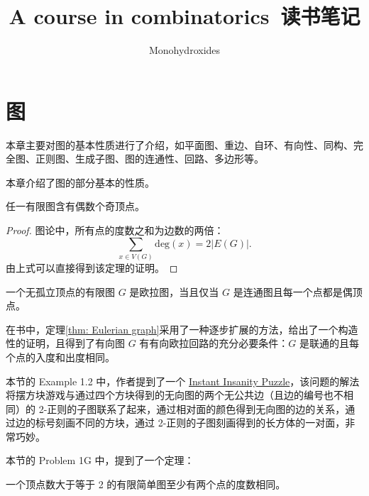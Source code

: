 \documentclass[cn,hazy,sakura,14pt,normal]{elegantnote}
\title{A course in combinatorics\ 读书笔记}
\author{Monohydroxides}
\date{\zhtoday}
\begin{document}
\begin{sloppypar}

\maketitle

\newpage

\tableofcontents

\newpage

\setcounter{page}{1}

\section{图} \label{sec: graph}

本章主要对图的基本性质进行了介绍，如平面图、重边、自环、有向性、同构、完全图、正则图、生成子图、图的连通性、回路、多边形等。

本章介绍了图的部分基本的性质。

\begin{theorem} \label{thm: First theorem of graph theory}
    任一有限图含有偶数个奇顶点。
\end{theorem}

\begin{proof}
    图论中，所有点的度数之和为边数的两倍：
    \begin{equation}
    \sum_{x \in V(G)} \text{deg}(x) = 2 \left| E(G) \right|.
    \end{equation}
    由上式可以直接得到该定理的证明。
\end{proof}

\begin{theorem} \label{thm: Eulerian graph}
    一个无孤立顶点的有限图 $G$ 是欧拉图，当且仅当 $G$ 是连通图且每一个点都是偶顶点。
\end{theorem}

在书中，定理\ref{thm: Eulerian graph}采用了一种逐步扩展的方法，给出了一个构造性的证明，且得到了有向图 $G$ 有有向欧拉回路的充分必要条件：$G$ 是联通的且每个点的入度和出度相同。

本节的 Example 1.2 中，作者提到了一个 \href{https://en.wikipedia.org/wiki/Instant\_Insanity}{Instant Insanity Puzzle}，该问题的解法将摆方块游戏与通过四个方块得到的无向图的两个无公共边（且边的编号也不相同）的 2-正则的子图联系了起来，通过相对面的颜色得到无向图的边的关系，通过边的标号刻画不同的方块，通过 2-正则的子图刻画得到的长方体的一对面，非常巧妙。

本节的 Problem 1G 中，提到了一个定理：

\begin{theorem}
    一个顶点数大于等于 2 的有限简单图至少有两个点的度数相同。
\end{theorem}


\end{sloppypar}
\end{document}
